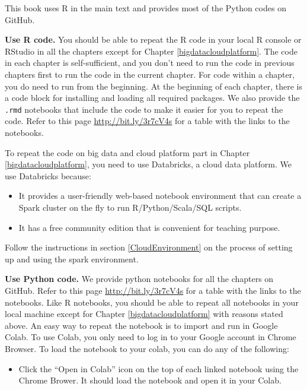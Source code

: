 \documentclass[
  12pt,
]{krantz}
\providecommand{\tightlist}{%
  \setlength{\itemsep}{0pt}\setlength{\parskip}{0pt}}
\begin{document}
This book uses R in the main text and provides most of the Python codes on GitHub.

\textbf{Use R code.} You should be able to repeat the R code in your local R console or RStudio in all the chapters except for Chapter \ref{bigdatacloudplatform}. The code in each chapter is self-sufficient, and you don't need to run the code in previous chapters first to run the code in the current chapter. For code within a chapter, you do need to run from the beginning. At the beginning of each chapter, there is a code block for installing and loading all required packages. We also provide the \texttt{.rmd} notebooks that include the code to make it easier for you to repeat the code. Refer to this page \url{http://bit.ly/3r7cV4s} for a table with the links to the notebooks.

To repeat the code on big data and cloud platform part in Chapter \ref{bigdatacloudplatform}, you need to use Databricks, a cloud data platform. We use Databricks because:

\begin{itemize}
\tightlist
\item
  It provides a user-friendly web-based notebook environment that can create a Spark cluster on the fly to run R/Python/Scala/SQL scripts.
\item
  It has a free community edition that is convenient for teaching purpose.
\end{itemize}

Follow the instructions in section \ref{CloudEnvironment} on the process of setting up and using the spark environment.

\textbf{Use Python code.} We provide python notebooks for all the chapters on GitHub. Refer to this page \url{http://bit.ly/3r7cV4s} for a table with the links to the notebooks. Like R notebooks, you should be able to repeat all notebooks in your local machine except for Chapter \ref{bigdatacloudplatform} with reasons stated above. An easy way to repeat the notebook is to import and run in Google Colab. To use Colab, you only need to log in to your Google account in Chrome Browser. To load the notebook to your colab, you can do any of the following:

\begin{itemize}
\tightlist
\item
  Click the ``Open in Colab'' icon on the top of each linked notebook using the Chrome Brower. It should load the notebook and open it in your Colab.
\end{itemize}
\end{document}
